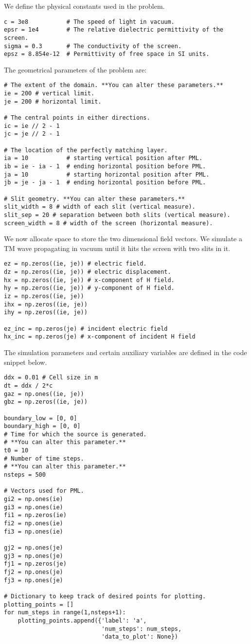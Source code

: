 \documentclass[11pt]{article}
\numberwithin{equation}{section}
\begin{document}
We define the physical constants used in the problem.
\begin{verbatim}
c = 3e8           # The speed of light in vacuum.
epsr = 1e4        # The relative dielectric permittivity of the screen.
sigma = 0.3       # The conductivity of the screen.
epsz = 8.854e-12  # Permittivity of free space in SI units.
\end{verbatim}

The geometrical parameters of the problem are:
\begin{verbatim}
# The extent of the domain. **You can alter these parameters.**
ie = 200 # vertical limit.
je = 200 # horizontal limit.

# The central points in either directions.
ic = ie // 2 - 1
jc = je // 2 - 1

# The location of the perfectly matching layer.
ia = 10           # starting vertical position after PML.
ib = ie - ia - 1  # ending horizontal position before PML.
ja = 10           # starting horizontal position after PML.
jb = je - ja - 1  # ending horizontal position before PML.

# Slit geometry. **You can alter these parameters.**
slit_width = 8 # width of each slit (vertical measure).
slit_sep = 20 # separation between both slits (vertical measure).
screen_width = 8 # width of the screen (horizontal measure).
\end{verbatim}

We now allocate space to store the two dimensional field vectors. We simulate
a TM wave propagating in vacuum until it hits the screen with two slits in 
it.
\begin{verbatim}
ez = np.zeros((ie, je)) # electric field.
dz = np.zeros((ie, je)) # electric displacement.
hx = np.zeros((ie, je)) # x-component of H field.
hy = np.zeros((ie, je)) # y-component of H field.
iz = np.zeros((ie, je))
ihx = np.zeros((ie, je))
ihy = np.zeros((ie, je))

ez_inc = np.zeros(je) # incident electric field
hx_inc = np.zeros(je) # x-component of incident H field
\end{verbatim}

The simulation parameters and certain auxiliary variables are defined in the
code snippet below.
\begin{verbatim}
ddx = 0.01 # Cell size in m
dt = ddx / 2*c
gaz = np.ones((ie, je))
gbz = np.zeros((ie, je))

boundary_low = [0, 0]
boundary_high = [0, 0]
# Time for which the source is generated. 
# **You can alter this parameter.**
t0 = 10       
# Number of time steps. 
# **You can alter this parameter.**
nsteps = 500  

# Vectors used for PML.
gi2 = np.ones(ie)
gi3 = np.ones(ie)
fi1 = np.zeros(ie)
fi2 = np.ones(ie)
fi3 = np.ones(ie)

gj2 = np.ones(je)
gj3 = np.ones(je)
fj1 = np.zeros(je)
fj2 = np.ones(je)
fj3 = np.ones(je)

# Dictionary to keep track of desired points for plotting.
plotting_points = []
for num_steps in range(1,nsteps+1):
    plotting_points.append({'label': 'a',
                            'num_steps': num_steps,
                            'data_to_plot': None})
\end{verbatim}
\end{document}
